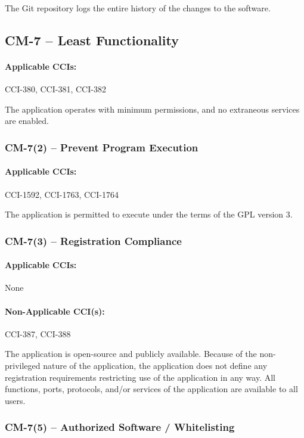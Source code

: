 \documentclass[letterpaper, 10pt, twoside]{article}
\begin{document}
The Git repository logs the entire history of the changes to the software.

\subsection{CM-7 -- Least Functionality}

\paragraph{Applicable CCIs:} CCI-380, CCI-381, CCI-382

The application operates with minimum permissions, and no extraneous services are enabled.

\subsubsection{CM-7(2) -- Prevent Program Execution}

\paragraph{Applicable CCIs:} CCI-1592, CCI-1763, CCI-1764

The application is permitted to execute under the terms of the GPL version 3.

\subsubsection{CM-7(3) -- Registration Compliance}

\paragraph{Applicable CCIs:} None

\paragraph{Non-Applicable CCI(s):} CCI-387, CCI-388

The application is open-source and publicly available. Because of the non-privileged nature of the application, the application does not define any registration requirements restricting use of the application in any way. All functions, ports, protocols, and/or services of the application are available to all users.

\subsubsection{CM-7(5) -- Authorized Software / Whitelisting}
\end{document}
